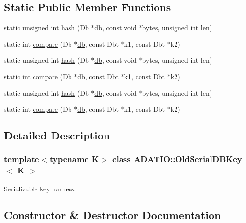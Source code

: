 \subsection*{Static Public Member Functions}
\begin{DoxyCompactItemize}
\item 
static unsigned int \mbox{\hyperlink{classADATIO_1_1OldSerialDBKey_a35cfd22922a3cd984d6a68cce998565f}{hash}} (Db $\ast$\mbox{\hyperlink{structdb}{db}}, const void $\ast$bytes, unsigned int len)
\item 
static int \mbox{\hyperlink{classADATIO_1_1OldSerialDBKey_a9f6e624dc2c8940397632286dbab1f61}{compare}} (Db $\ast$\mbox{\hyperlink{structdb}{db}}, const Dbt $\ast$k1, const Dbt $\ast$k2)
\item 
static unsigned int \mbox{\hyperlink{classADATIO_1_1OldSerialDBKey_a35cfd22922a3cd984d6a68cce998565f}{hash}} (Db $\ast$\mbox{\hyperlink{structdb}{db}}, const void $\ast$bytes, unsigned int len)
\item 
static int \mbox{\hyperlink{classADATIO_1_1OldSerialDBKey_a9f6e624dc2c8940397632286dbab1f61}{compare}} (Db $\ast$\mbox{\hyperlink{structdb}{db}}, const Dbt $\ast$k1, const Dbt $\ast$k2)
\item 
static unsigned int \mbox{\hyperlink{classADATIO_1_1OldSerialDBKey_a35cfd22922a3cd984d6a68cce998565f}{hash}} (Db $\ast$\mbox{\hyperlink{structdb}{db}}, const void $\ast$bytes, unsigned int len)
\item 
static int \mbox{\hyperlink{classADATIO_1_1OldSerialDBKey_a9f6e624dc2c8940397632286dbab1f61}{compare}} (Db $\ast$\mbox{\hyperlink{structdb}{db}}, const Dbt $\ast$k1, const Dbt $\ast$k2)
\end{DoxyCompactItemize}


\subsection{Detailed Description}
\subsubsection*{template$<$typename K$>$\newline
class A\+D\+A\+T\+I\+O\+::\+Old\+Serial\+D\+B\+Key$<$ K $>$}

Serializable key harness. 



\subsection{Constructor \& Destructor Documentation}
\mbox{\label{classADATIO_1_1OldSerialDBKey_a4ebea5cb376cbc7ce81524c8b9723923}} 
